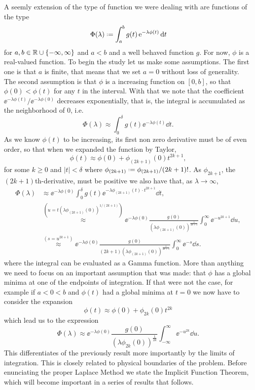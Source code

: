 A seemly extension of the type of function we were dealing with are functions of the type
\begin{equation}
	\Phi(\lambda) \deff \int_{a}^{b} g(t) \ee^{-\lambda \phi(t)} \dd t
	\label{equation: Laplace}
\end{equation}
for $a,b \in \mathbb{R} \cup \{-\infty, \infty\}$ and $a<b$ and a well behaved function $g$. For now, $\phi$ is a real-valued function. To begin the study let us make some assumptions. The first one is that $a$ is finite, that means that we set $a=0$ without loss of generality. The second assumption is that $\phi$ is a increasing function on $[0,b]$, so that $\phi(0) < \phi(t)$ for any $t$ in the interval. With that we note that the coefficient $\ee^{-\lambda \phi(t)} / \ee^{-\lambda \phi(0)}$ decreases exponentially, that is, the integral is accumulated as the neighborhood of $0$, i.e.
\begin{equation}
	\Phi(\lambda) \approx \int_{0}^{\delta} g(t) \ee^{-\lambda \phi(t)} \dd t.
\end{equation}
As we know $\phi(t)$ to be increasing, its first non zero derivative must be of even order, so that when we expanded the function by Taylor,
\begin{equation}
\phi(t) \approx \phi(0) + \phi_{(2k+1)}(0) t^{2k+1},
\end{equation}
for some $k\geq 0$ and $|t| < \delta$ where $\phi_{(2k+1)} \deff \phi_{(2k+1)}/(2k+1)!$. As $\phi_{2k+1}$, the $(2k+1)$th-derivative, must be positive we also have that, as $\lambda \rightarrow \infty$,
	\begin{align}
		\Phi(\lambda) & \approx \ee^{-\lambda \phi(0)} \int_{0}^{\delta} g(t) \ee^{-\lambda \phi_{(2k+1)}(t) \cdot t^{2k+1}} \dd t,\\
		& \stackrel{(u=t(\lambda \phi_{(2k+1)}(0))^{1/(2k+1)})}{\approx} \ee^{-\lambda \phi(0)} \frac{g(0)}{(\lambda \phi_{(2k+1)}(0))^{\frac{1}{2k+1}}} \int_{0}^{\infty} \ee^{-u^{2k+1}} \dd u, \\
		& \stackrel{(s=u^{2k+1})}{\approx} \ee^{-\lambda \phi(0)} \frac{g(0)}{ (2k+1)(\lambda \phi_{(2k+1)}(0))^{\frac{1}{2k+1}}} \int_{0}^{\infty} \ee^{-s} \dd s.
	\end{align}
where the integral can be evaluated as a Gamma function. More than anything we need to focus on an important assumption that was made: that $\phi$ has a global minima at one of the endpoints of integration. If that were not the case, for example if $a < 0 < b$ and $\phi(t)$ had a global minima at $t=0$ we now have to consider the expansion
\begin{equation}
\phi(t) \approx \phi(0) + \phi_{2k}(0) t^{2k}	
\end{equation}
which lead us to the expression
\begin{equation}
\Phi(\lambda) \approx \ee^{-\lambda \phi(0)} \frac{g(0)}{(\lambda \phi_{2k}(0))^{\frac{1}{2k}}} \int_{-\infty}^{\infty} \ee^{-u^{2k}} \dd u.
\end{equation}
This differentiates of the previously result more importantly by the limits of integration. This is closely related to physical boundaries of the problem. Before enunciating the proper Laplace Method we state the Implicit Function Theorem, which will become important in a series of results that follows.


